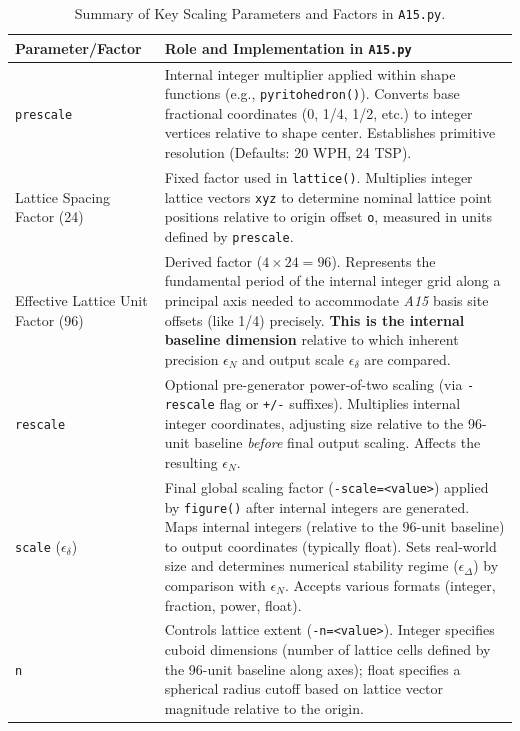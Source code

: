 \documentclass[10pt]{article}
\def\AAAB{\textit{A15}}
\begin{document}
\begin{table}[!ht]
\centering
\caption{Summary of Key Scaling Parameters and Factors in \texttt{A15.py}.}
\label{tab-scaling-params}
\begin{tabularx}{\textwidth}{>{\raggedright\arraybackslash}p{} >{\raggedright\arraybackslash}X}
\toprule
\textbf{Parameter/Factor} & \textbf{Role and Implementation in \texttt{A15.py}} \\
\midrule
\texttt{prescale} & Internal integer multiplier applied within shape functions (e.g., \texttt{pyritohedron()}). Converts base fractional coordinates (0, 1/4, 1/2, etc.) to integer vertices relative to shape center. Establishes primitive resolution (Defaults: \num{20} WPH, \num{24} TSP). \\ \addlinespace
Lattice Spacing Factor (\num{24}) & Fixed factor used in \texttt{lattice()}. Multiplies integer lattice vectors \texttt{xyz} to determine nominal lattice point positions relative to origin offset \texttt{o}, measured in units defined by \texttt{prescale}. \\ \addlinespace
Effective Lattice Unit Factor (\num{96}) & Derived factor ($4 \times 24 = 96$). Represents the fundamental period of the internal integer grid along a principal axis needed to accommodate \AAAB{} basis site offsets (like 1/4) precisely. \textbf{This is the internal baseline dimension} relative to which inherent precision $\epsilon_N$ and output scale $\epsilon_\delta$ are compared. \\ \addlinespace
\texttt{rescale} & Optional pre-generator power-of-two scaling (via \texttt{-rescale} flag or \texttt{+/-} suffixes). Multiplies internal integer coordinates, adjusting size relative to the 96-unit baseline \textit{before} final output scaling. Affects the resulting $\epsilon_N$. \\ \addlinespace
\texttt{scale} ($\epsilon_\delta$) & Final global scaling factor (\texttt{-scale=<value>}) applied by \texttt{figure()} after internal integers are generated. Maps internal integers (relative to the 96-unit baseline) to output coordinates (typically float). Sets real-world size and determines numerical stability regime ($\epsilon_\Delta$) by comparison with $\epsilon_N$. Accepts various formats (integer, fraction, power, float). \\ \addlinespace
\texttt{n} & Controls lattice extent (\texttt{-n=<value>}). Integer specifies cuboid dimensions (number of lattice cells defined by the 96-unit baseline along axes); float specifies a spherical radius cutoff based on lattice vector magnitude relative to the origin. \\
\bottomrule
\end{tabularx}
\end{table}
\end{document}
